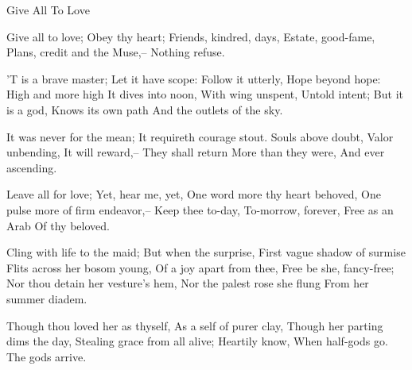 Give All To Love

Give all to love;
Obey thy heart;
Friends, kindred, days,
Estate, good-fame,
Plans, credit and the Muse,--
Nothing refuse.

'T is a brave master;
Let it have scope:
Follow it utterly,
Hope beyond hope:
High and more high
It dives into noon,
With wing unspent,
Untold intent;
But it is a god,
Knows its own path
And the outlets of the sky.

It was never for the mean;
It requireth courage stout.
Souls above doubt,
Valor unbending,
It will reward,--
They shall return
More than they were,
And ever ascending.

Leave all for love;
Yet, hear me, yet,
One word more thy heart behoved,
One pulse more of firm endeavor,--
Keep thee to-day,
To-morrow, forever,
Free as an Arab
Of thy beloved.

Cling with life to the maid;
But when the surprise,
First vague shadow of surmise
Flits across her bosom young,
Of a joy apart from thee,
Free be she, fancy-free;
Nor thou detain her vesture's hem,
Nor the palest rose she flung
From her summer diadem.

Though thou loved her as thyself,
As a self of purer clay,
Though her parting dims the day,
Stealing grace from all alive;
Heartily know,
When half-gods go.
The gods arrive.
